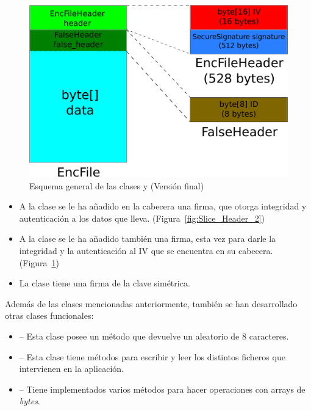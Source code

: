 \begin{figure}[!htb]
  \centering
  \includegraphics[scale=0.4]{Figures/EncFile_Header_2}
  \decoRule
  \caption[ -  (Versión final)]{Esquema general de las clases  y  (Versión final)}
  \label{fig:EncFile_Header_2}
\end{figure}

\begin{itemize}
  \item A la clase  se le ha añadido en la cabecera una firma, que otorga integridad y autenticación a los datos que lleva. (Figura~\ref{fig:Slice_Header_2})

  \item A la clase  se le ha añadido también una firma, esta vez para darle la integridad y la autenticación al IV que se encuentra en su cabecera. (Figura~\ref{fig:EncFile_Header_2})

  \item La clase  tiene una firma de la clave simétrica.
\end{itemize}

Además de las clases mencionadas anteriormente, también se han desarrollado otras clases funcionales:

\begin{itemize}
  \item {} -- Esta clase posee un método que devuelve un  aleatorio de 8 caracteres.

  \item {} -- Esta clase tiene métodos para escribir y leer los distintos ficheros que intervienen en la aplicación.

  \item {} -- Tiene implementados varios métodos para hacer operaciones con arrays de \emph{bytes}.
\end{itemize}

